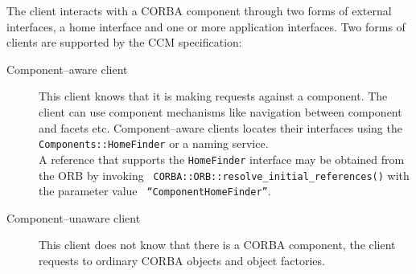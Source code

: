 The client interacts with a CORBA component through two forms of external
interfaces, a home interface and one or more application interfaces. Two forms
of clients are supported by the CCM specification:
\begin{description}
\item [Component--aware client] 
This client knows that it is making requests against a component. The client can
use component mechanisms like navigation between component and facets etc.
Component--aware clients locates their interfaces using the {\tt
Components::HomeFinder} or a naming service.\\ A reference that supports the
{\tt HomeFinder} interface may be obtained from the ORB by invoking {\tt
CORBA::ORB::resolve\_initial\_references()} with the parameter value {\tt
``ComponentHomeFinder''}.

\item [Component--unaware client]
This client does not know that there is a CORBA component, the client requests
to ordinary CORBA objects and object factories.
\end{description}



